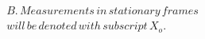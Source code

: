 \documentclass[preview]{standalone}
\begin{document}
\begin{align*}
B.\,Measurements\,in\,stationary\,frames\\will\,be\,denoted\,with\,subscript\,X_{o}.
\end{align*}
\end{document}
